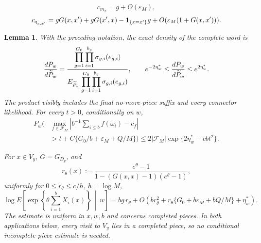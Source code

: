 \documentclass[12pt,reqno]{amsart}
\theoremstyle{plain}
\newtheorem{lemma}[theorem]{Lemma}
\theoremstyle{definition}
\theoremstyle{remark}
\numberwithin{equation}{section}
\begin{document}
\begin{equation}
 c_{m_x}=g+O(\varepsilon_M),                                \label{eq:tu-48b}
\end{equation}
\begin{equation}
 c_{q_{x,x'}}=gG(x,x')+gG(x',x)-{\bf1}_{\{x=x'\}}g
       +O(\varepsilon_M(1+G(x,x'))).                        \label{eq:tu-48c}
\end{equation}
\begin{lemma}\label{lem:terminal-feynman-kac}
With the preceding notation, the exact density of the complete word is
\begin{equation}
 {dP_w\over d\widetilde P_w}
 ={\displaystyle\prod_{g=1}^{G_0}\prod_{i=1}^{b_g}
          \sigma_{g,i}(e_{g,i})\over
   \displaystyle E_{\widetilde P_w}
       \prod_{g=1}^{G_0}\prod_{i=1}^{b_g}
          \sigma_{g,i}(e_{g,i})},
\qquad
 e^{-2\eta_w^*}\le
 {dP_w\over d\widetilde P_w}
 \le e^{2\eta_w^*}.                                        \label{eq:tu-48d}
\end{equation}
The product visibly includes the final no-more-piece suffix and every
connector likelihood.  For every \(t>0\), conditionally on \(w\),
\begin{equation}
\begin{split}
P_w\Bigg(&\max_{f\in\mathcal{F}_M}\left|
 b^{-1}\sum_{i\le b}f(\omega_i)-c_f\right|\\
&>t+C\{G_0/b+\varepsilon_M+Q/M\}\Bigg)
 \le2|\mathcal{F}_M|\exp\{2\eta_w^*-cbt^2\}.                   \end{split}
\label{eq:tu-49}
\end{equation}

For \(x\in V_y\), \(G=G_{D_y}\), and
\begin{equation}
 r_\theta(x):=
 \frac{e^\theta-1}
 {1-(G(x,x)-1)(e^\theta-1)},                                 \label{eq:tu-39}
\end{equation}
uniformly for \(0\le r_\theta\le c/h\), \(h=\log M\),
\begin{equation}
 \log E\left[\exp\left\{\theta\sum_{i=1}^bX_i(x)\right\}
             \,\middle|\,w\right]
       =bg\,r_\theta+O\left(br_\theta^2+
       r_\theta\{G_0+b\varepsilon_M+bQ/M\}
                    +\eta_w^*\right).                       \label{eq:tu-50}
\end{equation}
The estimate is uniform in \(x,w,b\) and concerns completed pieces.
In both applications below, every visit to \(V_y\) lies in a completed
piece, so no conditional incomplete-piece estimate is needed.


\end{lemma}
\end{document}
